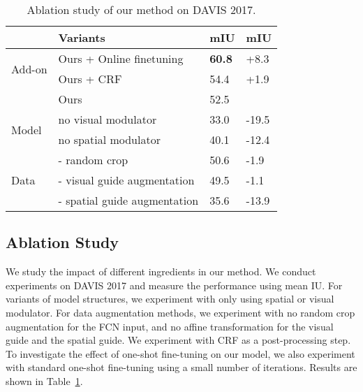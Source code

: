 \documentclass[10pt,twocolumn,letterpaper]{article}
\begin{document}
\begin{table}[]
\centering
\caption{Ablation study of our method on DAVIS 2017.}
\label{tab:ablation}
\begin{tabular}{llll}
\hline
                       & Variants                      & mIU  &  mIU \\ \hline
\multirow{2}{*}{Add-on}     & Ours + Online finetuning             & \textbf{60.8} & +8.3        \\ \cline{2-4}
                  & Ours + CRF                    &  54.4    &  +1.9            \\ \hline
                       & Ours                          & 52.5 &              \\ \hline
\multirow{2}{*}{Model} & no visual modulator           & 33.0 &   -19.5           \\ \cline{2-4} 
                       & no spatial modulator          & 40.1 &   -12.4           \\ \hline
\multirow{3}{*}{Data}  & - random crop  & 50.6 &      -1.9        \\ 
                       & - visual guide augmentation &  49.5    &  -1.1 \\
					& - spatial guide augmentation & 35.6  &  -13.9                     \\ \hline
\end{tabular}
\end{table}

\subsection{Ablation Study}
We study the impact of different ingredients in our method. We conduct experiments on DAVIS 2017 and measure the performance using mean IU. For variants of model structures, we experiment with only using spatial or visual modulator. For data augmentation methods, we experiment with no random crop augmentation for the FCN input, and no affine transformation for the visual guide and the spatial guide. We experiment with CRF as a post-processing step. To investigate the effect of one-shot fine-tuning on our model, we also experiment with standard one-shot fine-tuning using a small number of iterations. Results are shown in Table~\ref{tab:ablation}.
\end{document}
